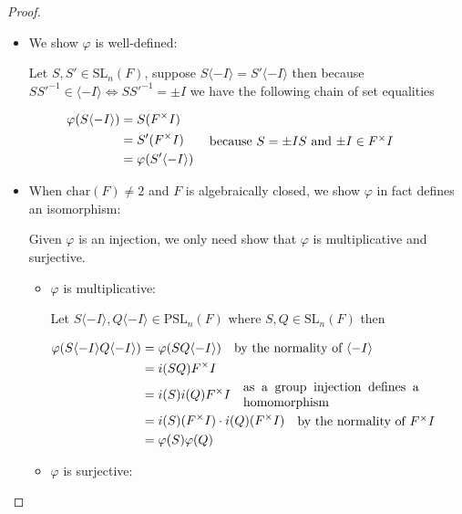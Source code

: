 \begin{proof}
\begin{itemize}
    \item We show $\varphi$ is well-defined:

Let $S, S' \in \textrm{SL}_n(F)$, suppose $S \langle -I\rangle = S'\langle -I\rangle$ then because $SS'^{-1} \in \langle -I\rangle \iff SS'^{-1} = \pm I$ we have the following chain of set equalities

\begin{align*}
    \varphi(S \langle -I \rangle) 
    &= S (F^\times I)\\
    &= S' (F^\times I) \qquad \parbox[c]{0.5
    \linewidth}{because $S = \pm I S$ and $\pm I \in F^\times I$}\\
    &= \varphi(S' \langle -I\rangle)
\end{align*}

\item When $\textrm{char}(F) \ne 2$ and $F$ is algebraically closed, we show $\varphi$ in fact defines an isomorphism:

Given $\varphi$ is an injection, we only need show that $\varphi$ is multiplicative and surjective.
\begin{itemize}
    \item $\varphi$ is multiplicative:

    Let $S \langle-I\rangle, Q\langle-I\rangle \in \textrm{PSL}_n(F)$ where $S, Q \in \textrm{SL}_n(F)$ then

    \begin{align*}
    \varphi(S \langle-I\rangle  Q\langle-I\rangle ) &= \varphi(SQ \langle -I\rangle) \quad \parbox[c]{0.4\linewidth}{by the normality of $\langle -I \rangle$}\\
    &= i(SQ) F^\times I\\
    &= i(S) i(Q) F^\times I \quad  \parbox[c]{0.4\linewidth}{as a group injection defines a homomorphism}\\
    &= i(S) (F^\times I) \cdot i(Q)(F^\times I) \quad \parbox[c] {0.4\linewidth}{ by the normality of $F^\times I$}\\
    &= \varphi(S) \varphi(Q)
    \end{align*}
    
    \item $\varphi$ is surjective:


\end{itemize}
\end{itemize}
\end{proof}
